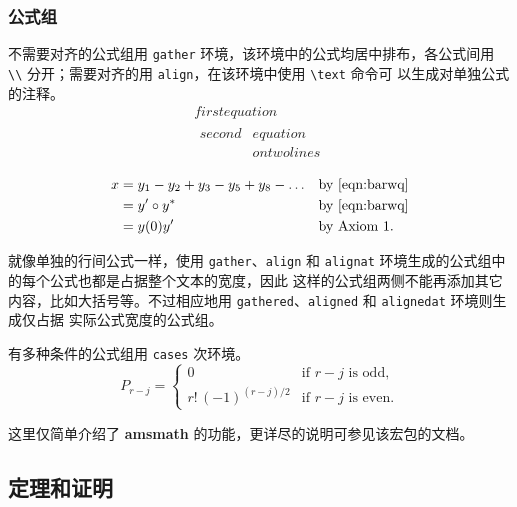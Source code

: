 \subsubsection{公式组}

不需要对齐的公式组用 \texttt{gather} 环境，该环境中的公式均居中排布，各公式间用
\verb|\\| 分开；需要对齐的用 \texttt{align}，在该环境中使用 \verb|\text| 命令可
以生成对单独公式的注释。
\begin{gather}
  first equation\\
  \begin{split}
    second & equation\\
           & on twolines
  \end{split}
\end{gather}

\begin{align}
 x & = y_1-y_2+y_3-y_5+y_8-\dots && \text{by \eqref{eqn:barwq}}\\
   & = y'\circ y^*               && \text{by \eqref{eqn:barwq}}\\
   & = y(0) y'                   && \text{by Axiom 1.}
\end{align}

就像单独的行间公式一样，使用 \texttt{gather}、\texttt{align} 和
\texttt{alignat} 环境生成的公式组中的每个公式也都是占据整个文本的宽度，因此
这样的公式组两侧不能再添加其它内容，比如大括号等。不过相应地用
\texttt{gathered}、\texttt{aligned} 和 \texttt{alignedat} 环境则生成仅占据
实际公式宽度的公式组。

有多种条件的公式组用 \texttt{cases} 次环境。
\[ P_{r-j}=\begin{cases}
  0& \text{if $r-j$ is odd},\\
  r!\,(-1)^{(r-j)/2}& \text{if $r-j$ is even}.
\end{cases} \]

这里仅简单介绍了 \textbf{amsmath} 的功能，更详尽的说明可参见该宏包的文档。

\subsection{定理和证明}

